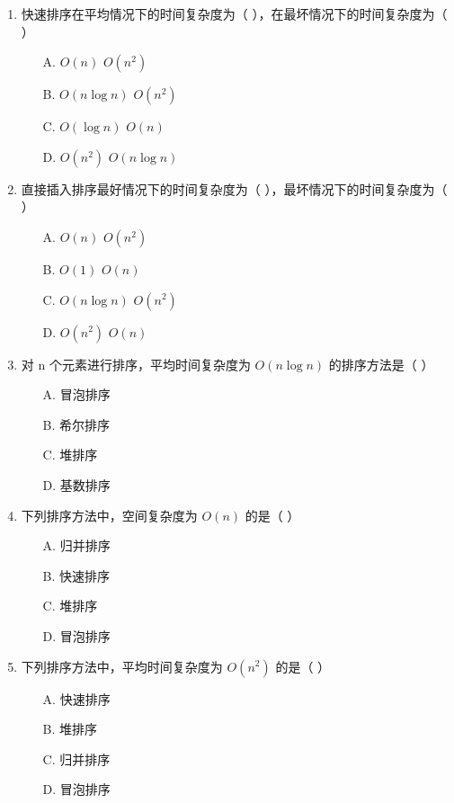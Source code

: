 \documentclass[12pt, a4paper]{article}
\begin{document}
\begin{enumerate}[label=\arabic*.]
	\item 快速排序在平均情况下的时间复杂度为（ ），在最坏情况下的时间复杂度为（ ）
	      \begin{enumerate}
		      \item[A.] $O(n)$ $O(n^2)$
		      \item[B.] $O(n \log n)$ $O(n^2)$
		      \item[C.] $O(\log n)$ $O(n)$
		      \item[D.] $O(n^2)$ $O(n \log n)$
	      \end{enumerate}

	\item 直接插入排序最好情况下的时间复杂度为（ ），最坏情况下的时间复杂度为（ ）
	      \begin{enumerate}
		      \item[A.] $O(n)$ $O(n^2)$
		      \item[B.] $O(1)$ $O(n)$
		      \item[C.] $O(n \log n)$ $O(n^2)$
		      \item[D.] $O(n^2)$ $O(n)$
	      \end{enumerate}

	\item 对 n 个元素进行排序，平均时间复杂度为 $O(n \log n)$ 的排序方法是（ ）
	      \begin{enumerate}
		      \item[A.] 冒泡排序
		      \item[B.] 希尔排序
		      \item[C.] 堆排序
		      \item[D.] 基数排序
	      \end{enumerate}

	\item 下列排序方法中，空间复杂度为 $O(n)$ 的是（ ）
	      \begin{enumerate}
		      \item[A.] 归并排序
		      \item[B.] 快速排序
		      \item[C.] 堆排序
		      \item[D.] 冒泡排序
	      \end{enumerate}

	\item 下列排序方法中，平均时间复杂度为 $O(n^2)$ 的是（ ）
	      \begin{enumerate}
		      \item[A.] 快速排序
		      \item[B.] 堆排序
		      \item[C.] 归并排序
		      \item[D.] 冒泡排序
	      \end{enumerate}


\end{enumerate}
\end{document}
